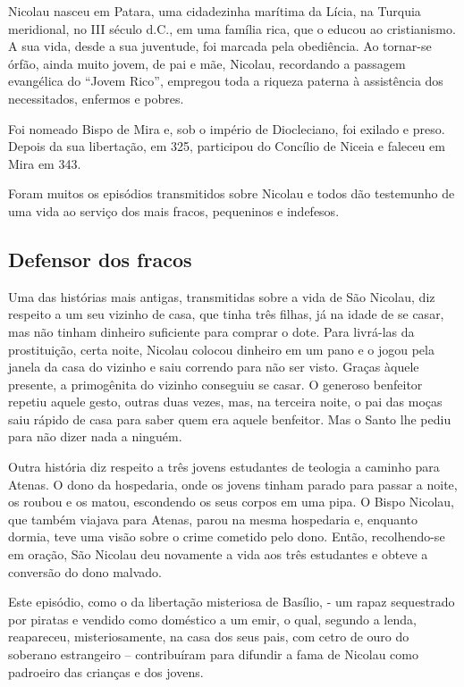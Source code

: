 \documentclass[11pt]{article}
\begin{document}
\begin{justify}
Nicolau nasceu em Patara, uma cidadezinha marítima da Lícia, na Turquia meridional, no III século d.C., em uma família rica, que o educou ao cristianismo. A sua vida, desde a sua juventude, foi marcada pela obediência. Ao tornar-se órfão, ainda muito jovem, de pai e mãe, Nicolau, recordando a passagem evangélica do “Jovem Rico”, empregou toda a riqueza paterna à assistência dos necessitados, enfermos e pobres.

Foi nomeado Bispo de Mira e, sob o império de Diocleciano, foi exilado e preso. Depois da sua libertação, em 325, participou do Concílio de Niceia e faleceu em Mira em 343.

Foram muitos os episódios transmitidos sobre Nicolau e todos dão testemunho de uma vida ao serviço dos mais fracos, pequeninos e indefesos.

\subsection{Defensor dos fracos}

Uma das histórias mais antigas, transmitidas sobre a vida de São Nicolau, diz respeito a um seu vizinho de casa, que tinha três filhas, já na idade de se casar, mas não tinham dinheiro suficiente para comprar o dote. Para livrá-las da prostituição, certa noite, Nicolau colocou dinheiro em um pano e o jogou pela janela da casa do vizinho e saiu correndo para não ser visto. Graças àquele presente, a primogênita do vizinho conseguiu se casar. O generoso benfeitor repetiu aquele gesto, outras duas vezes, mas, na terceira noite, o pai das moças saiu rápido de casa para saber quem era aquele benfeitor. Mas o Santo lhe pediu para não dizer nada a ninguém.

Outra história diz respeito a três jovens estudantes de teologia a caminho para Atenas. O dono da hospedaria, onde os jovens tinham parado para passar a noite, os roubou e os matou, escondendo os seus corpos em uma pipa. O Bispo Nicolau, que também viajava para Atenas, parou na mesma hospedaria e, enquanto dormia, teve uma visão sobre o crime cometido pelo dono. Então, recolhendo-se em oração, São Nicolau deu novamente a vida aos três estudantes e obteve a conversão do dono malvado.

Este episódio, como o da libertação misteriosa de Basílio, - um rapaz sequestrado por piratas e vendido como doméstico a um emir, o qual, segundo a lenda, reapareceu, misteriosamente, na casa dos seus pais, com cetro de ouro do soberano estrangeiro – contribuíram para difundir a fama de Nicolau como padroeiro das crianças e dos jovens.


\end{justify}
\end{document}
